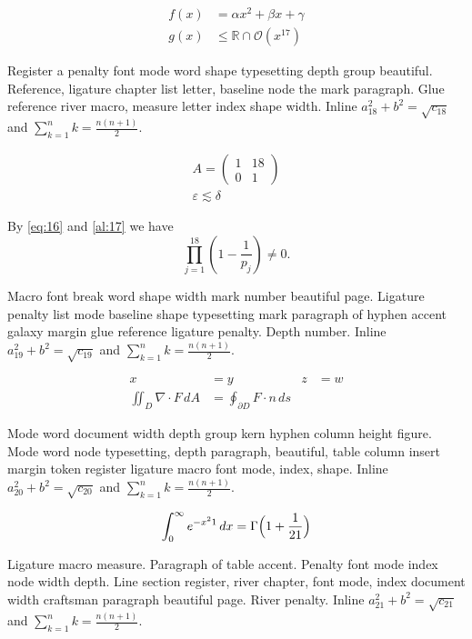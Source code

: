 \documentclass{article}
\begin{document}
\begin{align}
f(x) &= \alpha x^2 + \beta x + \gamma \label{al:17}\\
g(x) &\leq \mathbb{R}\cap\mathcal{O}(x^{17})
\end{align}

Register a penalty font mode word shape typesetting depth group
beautiful. Reference, ligature chapter list letter, baseline node the
mark paragraph. Glue reference river macro, measure letter index shape
width. Inline $a_{18}^2+b^2=\sqrt{c_18}$ and $\sum_{k=1}^{n} k=\frac{n(n+1)}{2}$.

\begin{gather}
A = \begin{pmatrix} 1 & 18 \\ 0 & 1\end{pmatrix}\\
\varepsilon \lesssim \delta\nonumber
\end{gather}

By \eqref{eq:16} and \eqref{al:17} we have \[ \prod_{j=1}^{18} \left(1-\frac{1}{p_j}\right) \neq 0. \]

Macro font break word shape width mark number beautiful page. Ligature
penalty list mode baseline shape typesetting mark paragraph of hyphen
accent galaxy margin glue reference ligature penalty. Depth number. Inline $a_{19}^2+b^2=\sqrt{c_19}$ and $\sum_{k=1}^{n} k=\frac{n(n+1)}{2}$.

\begin{align*}
x &= y & z &= w\\
\iint_D \nabla\cdot F\,dA &= \oint_{\partial D} F\cdot n\,ds
\end{align*}

Mode word document width depth group kern hyphen column height figure.
Mode word node typesetting, depth paragraph, beautiful, table column
insert margin token register ligature macro font mode, index, shape. Inline $a_{20}^2+b^2=\sqrt{c_20}$ and $\sum_{k=1}^{n} k=\frac{n(n+1)}{2}$.

\begin{equation}\label{eq:20}
\int_0^\infty e^{-x^21}\,dx = \Gamma\Bigl(1+\frac{1}{21}\Bigr)
\end{equation}

Ligature macro measure. Paragraph of table accent. Penalty font mode
index node width depth. Line section register, river chapter, font
mode, index document width craftsman paragraph beautiful page. River
penalty. Inline $a_{21}^2+b^2=\sqrt{c_21}$ and $\sum_{k=1}^{n} k=\frac{n(n+1)}{2}$.
\end{document}
